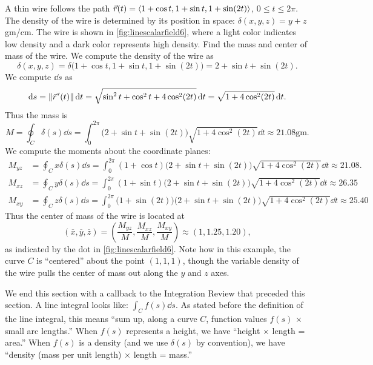 \begin{example}\label{ex_linescalarfield6}%
A
%
%
thin wire follows the path $\vec r(t) =\left\langle 1+\cos t,1+\sin t, 1+ \sin(2t)\right\rangle$, $0\leq t\leq 2\pi$. The density of the wire is determined by its position in space: $\delta(x,y,z) = y+z$ gm/cm. The wire is shown in \autoref{fig:linescalarfield6}, where a light color indicates low density and a dark color represents high density. Find the mass  and center of mass of the wire.
\solution
We compute the density of the wire as 
\[
\delta(x,y,z) = \delta\bigl(1+\cos t,1+\sin t, 1+\sin(2t)\bigr) = 2+\sin t+\sin(2t).
\]
We compute $\dd s$ as
\[
\operatorname{d}\! s = \left\lVert \vec r\hskip1.25pt '(t) \right\rVert\operatorname{d}\! t = \sqrt{\sin^2t+\cos^2t+4\cos^2(2t)}\operatorname{d}\! t
= \sqrt{1+4\cos^2(2t)}\operatorname{d}\! t.
\]
Thus the mass is
\[
M = \oint_C \delta(s)\dd s = \int_0^{2\pi} \bigl(2+\sin t+\sin(2t)\bigr)\sqrt{1+4\cos^2(2t)}\dd t
\approx 21.08\text{gm}.
\]
We compute the moments about the coordinate planes:
{\small
\begin{align*}
M_{yz} &= \oint_C x\delta(s)\dd s = \int_0^{2\pi}\!\!(1+\cos t)\bigl(2+\sin t+\sin(2t)\bigr)\sqrt{1+4\cos^2(2t)}\dd t \approx 21.08. \\
M_{xz} &= \oint_C y\delta(s)\dd s = \int_0^{2\pi}\!\!(1+\sin t)\bigl(2+\sin t+\sin(2t)\bigr)\sqrt{1+4\cos^2(2t)}\dd t \approx
26.35\\
M_{xy} &= \oint_C z\delta(s)\dd s = \int_0^{2\pi}\!\!\bigl(1+\sin(2 t)\bigr)\bigl(2+\sin t+\sin(2t)\bigr)\sqrt{1+4\cos^2(2t)}\dd t \approx 25.40
\end{align*}}
Thus the center of mass of the wire is located at 
\[
(\overline{x},\overline{y},\overline{z})
=\left(\frac{M_{yz}}M, \frac{M_{xz}}M,\frac{M_{xy}}M\right) \approx (1,1.25,1.20),
\]
as indicated by the dot in \autoref{fig:linescalarfield6}. Note how in this example, the curve $C$ is ``centered'' about the point $(1,1,1)$, though the variable density of the wire pulls the center of mass out along the $y$ and $z$ axes.
\end{example}

We end this section with a callback to the Integration Review that preceded this section. A line integral looks like: $\int_C f(s)\dd s$. As stated before the definition of the line integral, this means ``sum up, along a curve $C$, function values $f(s)$ $\times$ small arc lengths.'' When $f(s)$ represents a height, we have ``height $\times$ length = area.'' When $f(s)$ is a density (and we use $\delta(s)$ by convention), we have ``density (mass per unit length) $\times$ length = mass.''

